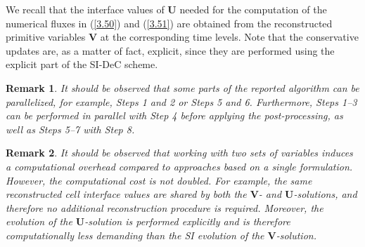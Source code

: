 \documentclass[A4paper,12pt,twoside]{article}
\newtheorem{remark}{Remark}[section]
\numberwithin{equation}{section}
\numberwithin{figure}{section}
\numberwithin{table}{section}
\newcommand\eref[1]{(\ref{#1})}
\begin{document}
We recall that the interface values of $\bm U$ needed for the computation of the numerical fluxes in \eref{3.50} and \eref{3.51} are
obtained from the reconstructed primitive variables $\bm V$ at the corresponding time levels. Note that the conservative updates are, as a
matter of fact, explicit, since they are performed using the explicit part of the SI-DeC scheme.

{\color{black}
\begin{remark}
It should be observed that some parts of the reported algorithm can be parallelized, for example, Steps 1 and 2 or Steps 5 and 6.
Furthermore, Steps 1--3 can be performed in parallel with Step 4 before applying the post-processing, as well as Steps 5--7 with Step 8.
\end{remark}}

{\color{black}
\begin{remark}
It should be observed that working with two sets of variables induces a computational overhead compared to approaches based on a single
formulation. However, the computational cost is not doubled. For example, the same reconstructed cell interface values are shared by both
the $\bm V$- and $\bm U$-solutions, and therefore no additional reconstruction procedure is required. Moreover, the evolution of the
$\bm U$-solution is performed explicitly and is therefore computationally less demanding than the SI evolution of the $\bm V$-solution.
\end{remark}
}
\end{document}
